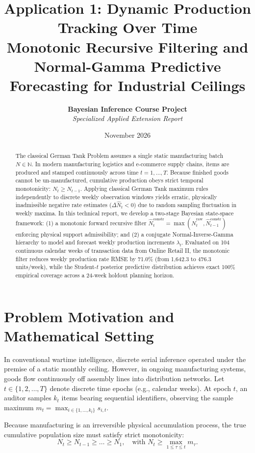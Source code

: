 \documentclass[11pt,a4paper]{article}
\title{\textbf{\Large Application 1: Dynamic Production Tracking Over Time}\\
\large Monotonic Recursive Filtering and Normal-Gamma Predictive Forecasting for Industrial Ceilings}
\author{\textbf{Bayesian Inference Course Project} \\
\textit{Specialized Applied Extension Report}}
\date{November 2026}
\begin{document}
\maketitle

\begin{abstract}
The classical German Tank Problem assumes a single static manufacturing batch $N \in \mathbb{N}$. In modern manufacturing logistics and e-commerce supply chains, items are produced and stamped continuously across time $t = 1, \dots, T$. Because finished goods cannot be un-manufactured, cumulative production obeys strict temporal monotonicity: $N_t \ge N_{t-1}$. Applying classical German Tank maximum rules independently to discrete weekly observation windows yields erratic, physically inadmissible negative rate estimates ($\Delta \hat{N}_t < 0$) due to random sampling fluctuation in weekly maxima. In this technical report, we develop a two-stage Bayesian state-space framework: (1) a monotonic forward recursive filter $\hat{N}_t^{\text{constr}} = \max(\hat{N}_t^{\text{raw}}, \hat{N}_{t-1}^{\text{constr}})$ enforcing physical support admissibility; and (2) a conjugate Normal-Inverse-Gamma hierarchy to model and forecast weekly production increments $\lambda_t$. Evaluated on 104 continuous calendar weeks of transaction data from Online Retail II, the monotonic filter reduces weekly production rate RMSE by 71.0\% (from 1,642.3 to 476.3 units/week), while the Student-$t$ posterior predictive distribution achieves exact 100\% empirical coverage across a 24-week holdout planning horizon.
\end{abstract}

\section{Problem Motivation and Mathematical Setting}

In conventional wartime intelligence, discrete serial inference operated under the premise of a static monthly ceiling. However, in ongoing manufacturing systems, goods flow continuously off assembly lines into distribution networks. Let $t \in \{1, 2, \dots, T\}$ denote discrete time epochs (e.g., calendar weeks). At epoch $t$, an auditor samples $k_t$ items bearing sequential identifiers, observing the sample maximum $m_t = \max_{i \in \{1, \dots, k_t\}} s_{i, t}$.

Because manufacturing is an irreversible physical accumulation process, the true cumulative population size must satisfy strict monotonicity:
\begin{equation}
N_t \ge N_{t-1} \ge \dots \ge N_1, \quad \text{with } N_t \ge \max_{1 \le \tau \le t} m_\tau.
\end{equation}
\end{document}
